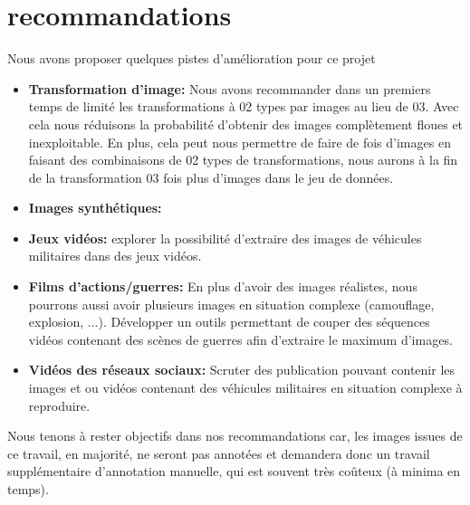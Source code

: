 \section{recommandations}
Nous avons proposer quelques pistes d'amélioration pour ce projet

\begin{itemize}
    \item \textbf{Transformation d'image:} Nous avons recommander dans un premiers temps de limité les transformations à 02 types par images au lieu de 03. Avec cela nous réduisons la probabilité d'obtenir des images complètement floues et inexploitable. En plus, cela peut nous permettre de faire de fois d'images en faisant des combinaisons de 02 types de transformations, nous aurons à la fin de la transformation 03 fois plus d'images dans le jeu de données.
    \item \textbf{Images synthétiques:}
    \item \textbf{Jeux vidéos:} explorer la possibilité d'extraire des images de véhicules militaires dans des jeux vidéos.
    \item \textbf{Films d'actions/guerres: } En plus d'avoir des images réalistes, nous pourrons aussi avoir plusieurs images en situation complexe (camouflage, explosion, ...). Développer un outils permettant de couper des séquences vidéos contenant des scènes de guerres afin d'extraire le maximum d'images.
    \item \textbf{Vidéos des réseaux sociaux: } Scruter des publication pouvant contenir les images et ou vidéos contenant des véhicules militaires en situation complexe à reproduire.
\end{itemize}

Nous tenons à rester objectifs dans nos recommandations car, les images issues de ce travail, en majorité, ne seront pas annotées  et demandera donc un travail supplémentaire d’annotation manuelle, qui est souvent très coûteux (à minima en temps).
